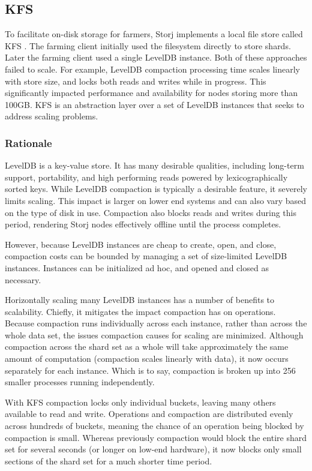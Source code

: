 \documentclass[a4paper,10pt]{article}
\begin{document}
\subsection{KFS}
To facilitate on-disk storage for farmers, Storj implements a local file store called KFS \cite{12}. The farming client initially used the filesystem directly to store shards. Later the farming client used a single LevelDB instance. Both of these approaches failed to scale. For example, LevelDB compaction processing time scales linearly with store size, and locks both reads and writes while in progress. This significantly impacted performance and availability for nodes storing more than 100GB. KFS is an abstraction layer over a set of LevelDB instances that seeks to address scaling problems.

\subsubsection{Rationale}
LevelDB is a key-value store. It has many desirable qualities, including long-term support, portability, and high performing reads powered by lexicographically sorted keys. While LevelDB compaction is typically a desirable feature, it severely limits scaling. This impact is larger on lower end systems and can also vary based on the type of disk in use. Compaction also blocks reads and writes during this period, rendering Storj nodes effectively offline until the process completes.

However, because LevelDB instances are cheap to create, open, and close, compaction costs can be bounded by managing a set of size-limited LevelDB instances. Instances can be initialized ad hoc, and opened and closed as necessary.

Horizontally scaling many LevelDB instances has a number of benefits to scalability. Chiefly, it mitigates the impact compaction has on operations. Because compaction runs individually across each instance, rather than across the whole data set, the issues compaction causes for scaling are minimized. Although compaction across the shard set as a whole will take approximately the same amount of computation (compaction scales linearly with data), it now occurs separately for each instance. Which is to say, compaction is broken up into 256 smaller processes running independently.

With KFS compaction locks only individual buckets, leaving many others available to read and write. Operations and compaction are distributed evenly across hundreds of buckets, meaning the chance of an operation being blocked by compaction is small. Whereas previously compaction would block the entire shard set for several seconds (or longer on low-end hardware), it now blocks only small sections of the shard set for a much shorter time period.
\end{document}
